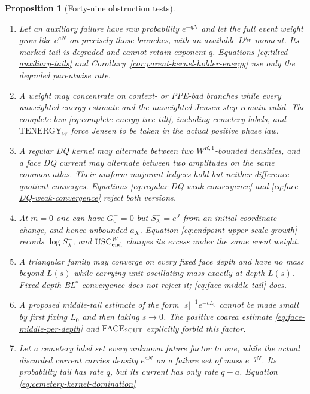 \documentclass[11pt]{article}
\newtheorem{proposition}[theorem]{Proposition}
\begin{document}
\begin{proposition}[Forty-nine obstruction tests]
\begin{enumerate}[label=\textup{(T\arabic*)}]
      correlated-mark model.
\item Let an auxiliary failure have raw probability $e^{-qN}$ and let the
      full event weight grow like $e^{aN}$ on precisely those branches, with
      an available $L^{p_W}$ moment.  Its marked tail is degraded and cannot
      retain exponent $q$.  Equations
      \eqref{eq:tilted-auxiliary-tails} and
      Corollary~\ref{cor:parent-kernel-holder-energy} use only the degraded
      parentwise rate.
\item A weight may concentrate on context- or PPE-bad branches while every
      unweighted energy estimate and the unweighted Jensen step remain
      valid.  The complete law \eqref{eq:complete-energy-tree-tilt}, including
      cemetery labels, and $\mathrm{TENERGY}_{W}$ force Jensen to be taken in
      the actual positive phase law.
\item A regular DQ kernel may alternate between two
      $W^{R,1}$-bounded densities, and a face DQ current may alternate between
      two amplitudes on the same common atlas.  Their uniform majorant ledgers
      hold but neither difference quotient converges.  Equations
      \eqref{eq:regular-DQ-weak-convergence} and
      \eqref{eq:face-DQ-weak-convergence} reject both versions.
\item At $m=0$ one can have $G_0^-=0$ but
      $S_\lambda^-=e^J$ from an initial coordinate change, and hence
      unbounded $a_X$.  Equation \eqref{eq:endpoint-upper-scale-growth} records
      $\log S_\lambda^-$, and $\mathrm{USC}_{\rm end}^{W}$ charges its excess
      under the same event weight.
\item A triangular family may converge on every fixed face depth and have
      no mass beyond $L(s)$ while carrying unit oscillating mass exactly at
      depth $L(s)$.  Fixed-depth BL$^*$ convergence does not reject it;
      \eqref{eq:face-middle-tail} does.
\item A proposed middle-tail estimate of the form
      $|s|^{-1}e^{-cL_0}$ cannot be made small by first fixing $L_0$ and then
      taking $s\to0$.  The positive coarea estimate
      \eqref{eq:face-middle-per-depth} and
      $\mathrm{FACE}_{\rm 2CUT}$ explicitly forbid this factor.
\item Let a cemetery label set every unknown future factor to one, while the
      actual discarded current carries density $e^{aN}$ on a failure set of
      mass $e^{-qN}$.  Its probability tail has rate $q$, but its current
      has only rate $q-a$.  Equation \eqref{eq:cemetery-kernel-domination}

\end{enumerate}
\end{proposition}
\end{document}
